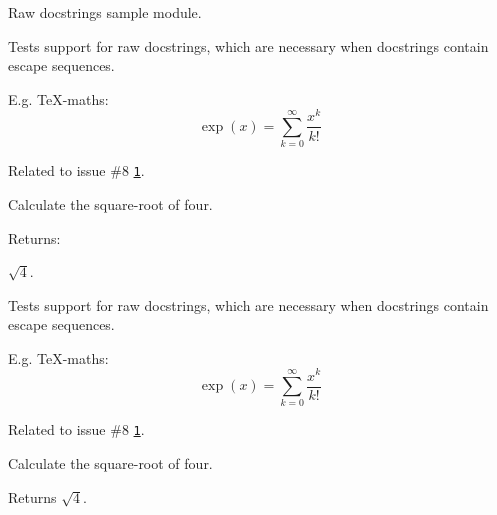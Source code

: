Raw docstrings sample module. 

Tests support for raw docstrings, which are necessary when docstrings contain escape sequences.

E.\-g. Te\-X-\/maths\-: \[ \exp(x) = \sum_{k=0}^{\infty} \frac{x^k}{k!} \]

Related to issue \#8 \href{https://github.com/Feneric/doxypypy/issues/8}{\tt 1}.

Calculate the square-\/root of four. \begin{DoxyVerb}Returns:
\end{DoxyVerb}
 $ \sqrt{4} $.

Tests support for raw docstrings, which are necessary when docstrings contain escape sequences.

E.\-g. Te\-X-\/maths\-: \[ \exp(x) = \sum_{k=0}^{\infty} \frac{x^k}{k!} \]

Related to issue \#8 \href{https://github.com/Feneric/doxypypy/issues/8}{\tt 1}.

Calculate the square-\/root of four.

\begin{DoxyReturn}{Returns}
$ \sqrt{4} $. 
\end{DoxyReturn}
